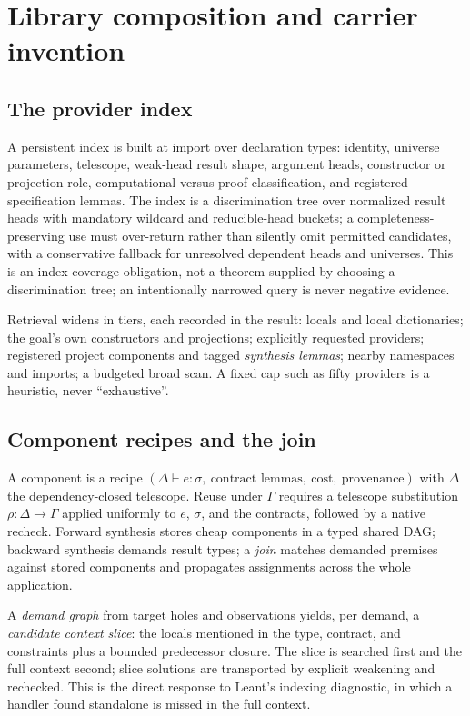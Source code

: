 \section{Library composition and carrier invention}\label{sec:library}

\subsection{The provider index}

A persistent index is built at import over declaration types: identity, universe parameters, telescope, weak-head result shape, argument heads, constructor or projection role, computational-versus-proof classification, and registered specification lemmas. The index is a discrimination tree over normalized result heads with mandatory wildcard and reducible-head buckets; a completeness-preserving use must over-return rather than silently omit permitted candidates, with a conservative fallback for unresolved dependent heads and universes. This is an index coverage obligation, not a theorem supplied by choosing a discrimination tree; an intentionally narrowed query is never negative evidence.

Retrieval widens in tiers, each recorded in the result: locals and local dictionaries; the goal's own constructors and projections; explicitly requested providers; registered project components and tagged \emph{synthesis lemmas}; nearby namespaces and imports; a budgeted broad scan. A fixed cap such as fifty providers is a heuristic, never ``exhaustive''.

\subsection{Component recipes and the join}

A component is a recipe $(\Delta \vdash e : \sigma,\ \text{contract lemmas},\ \text{cost},\ \text{provenance})$ with $\Delta$ the dependency-closed telescope. Reuse under $\Gamma$ requires a telescope substitution $\rho : \Delta \to \Gamma$ applied uniformly to $e$, $\sigma$, and the contracts, followed by a native recheck. Forward synthesis stores cheap components in a typed shared DAG; backward synthesis demands result types; a \emph{join} matches demanded premises against stored components and propagates assignments across the whole application.

A \emph{demand graph} from target holes and observations yields, per demand, a \emph{candidate context slice}: the locals mentioned in the type, contract, and constraints plus a bounded predecessor closure. The slice is searched first and the full context second; slice solutions are transported by explicit weakening and rechecked. This is the direct response to Leant's indexing diagnostic, in which a handler found standalone is missed in the full context.

